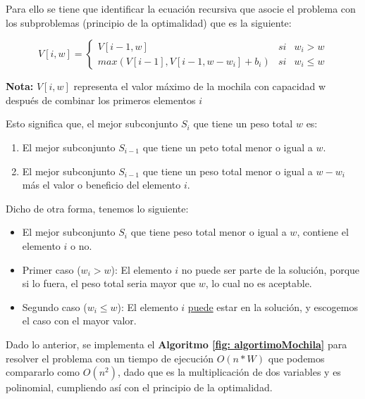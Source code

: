 Para ello se tiene que identificar la ecuación recursiva que asocie el problema con los subproblemas (principio de la optimalidad) que es la siguiente:

\begin{equation}
    V[i,w]  = \left\lbrace
    \begin{array}{lcc}
        V[i-1,w] & si & w_i>w\\
        max(V[i-1],V[i-1,w-w_i]+b_i) & si & w_i \leq w
    \end{array}
    \right.
\end{equation}

\textbf{Nota:} $V[i,w]$ representa el valor máximo de la mochila con capacidad w después de combinar los primeros elementos $i$

Esto significa que, el mejor subconjunto $S_i$ que tiene un peso total $w$ es:

\begin{enumerate}
    \item El mejor subconjunto $S_{i-1}$ que tiene un peto total menor o igual a $w$.
    \item El mejor subconjunto $S_{i-1}$ que tiene un peso total menor o igual a $w-w_i$ más el valor o beneficio del elemento $i$.
\end{enumerate}

Dicho de otra forma, tenemos lo siguiente:
\begin{itemize}
    \item El mejor subconjunto $S_i$ que tiene peso total menor o igual a $w$, contiene el elemento $i$ o no.
    \item Primer caso ($w_i>w$): El elemento $i$ no puede ser parte de la solución, porque si lo fuera, el peso total seria mayor que $w$, lo cual no es aceptable.
    \item Segundo caso ($w_i \leq w$): El elemento $i$ \underline{puede} estar en la solución, y escogemos el caso con el mayor valor.
\end{itemize}

Dado lo anterior, se implementa el \textbf{Algoritmo \ref{fig: algortimoMochila}} para resolver el problema con un tiempo de ejecución $O(n*W)$ que podemos compararlo como $O(n^2)$, dado que es la multiplicación de dos variables y es polinomial, cumpliendo así con el principio de la optimalidad.


\renewcommand{\algorithmicrequire}{\textbf{Entrada:}}
\renewcommand{\algorithmicensure}{\textbf{Salida:}}


